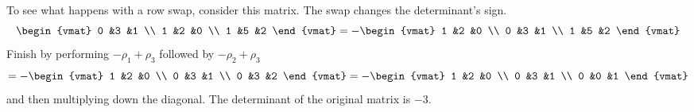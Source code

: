 \documentclass[9pt,t]{beamer}
\begin{document}
\begin{frame}
\ex
To see what happens with a row swap,
consider this matrix. 
The swap changes the determinant's sign.
\begin{equation*}
  \begin{vmat}
    0  &3  &1 \\
    1  &2  &0 \\
    1  &5  &2
  \end{vmat}
  =
  -\begin{vmat}
    1  &2  &0 \\
    0  &3  &1 \\
    1  &5  &2
  \end{vmat}
\end{equation*}
Finish by performing $-\rho_1+\rho_3$
followed by $-\rho_2+\rho_3$
\begin{equation*}
  =-\begin{vmat}
    1  &2  &0 \\
    0  &3  &1 \\
    0  &3  &2
  \end{vmat}
  =-\begin{vmat}
    1  &2  &0 \\
    0  &3  &1 \\
    0  &0  &1
  \end{vmat}
\end{equation*}
and then multiplying down the diagonal.
The determinant of the original matrix is $-3$.
\end{frame}
\end{document}
